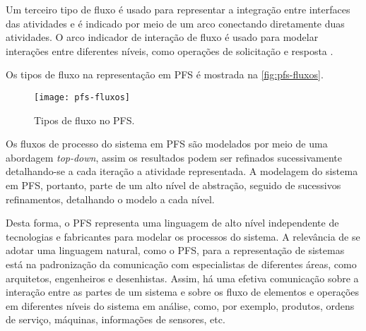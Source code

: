 	Um terceiro tipo de fluxo é usado para representar a integração entre interfaces das atividades e é indicado por meio de um arco conectando diretamente duas atividades. O arco indicador de interação de fluxo é usado para modelar interações entre diferentes níveis, como operações de solicitação e resposta \cite{pisching2018pfs}.
	
	Os tipos de fluxo na representação em PFS é mostrada na \autoref{fig:pfs-fluxos}.
	
	\begin{figure}[htb]
		\centering
		\caption{Tipos de fluxo no PFS.}
		\label{fig:pfs-fluxos}
		\texttt{[image: pfs-fluxos]}
	\end{figure}
	
	Os fluxos de processo do sistema em PFS são modelados por meio de uma abordagem \textit{top-down}, assim os resultados podem ser refinados sucessivamente detalhando-se a cada iteração a atividade representada. A modelagem do sistema em PFS, portanto, parte de um alto nível de abstração, seguido de sucessivos refinamentos, detalhando o modelo a cada nível.
	
	Desta forma, o PFS representa uma linguagem de alto nível independente de tecnologias e fabricantes para modelar os processos do sistema. A relevância de se adotar uma linguagem natural, como o PFS, para a representação de sistemas está na padronização da comunicação com especialistas de diferentes áreas, como arquitetos, engenheiros e desenhistas. Assim, há uma efetiva comunicação sobre a interação entre as partes de um sistema e sobre os fluxo de elementos e operações em diferentes níveis do sistema em análise, como, por exemplo, produtos, ordens de serviço, máquinas, informações de sensores, etc.
